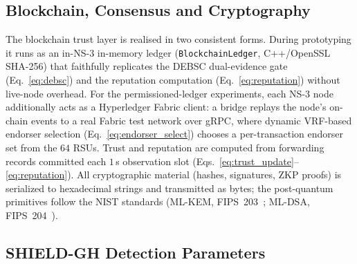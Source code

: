\documentclass[12pt, a4paper]{report}
\begin{document}
\subsection{Blockchain, Consensus and Cryptography}

The blockchain trust layer is realised in two consistent forms. During
prototyping it runs as an in-NS-3 in-memory ledger (\texttt{BlockchainLedger},
C++/OpenSSL SHA-256) that faithfully replicates the DEBSC dual-evidence gate
(Eq.~\eqref{eq:debsc}) and the reputation computation (Eq.~\eqref{eq:reputation})
without live-node overhead. For the permissioned-ledger experiments, each NS-3
node additionally acts as a Hyperledger Fabric client: a bridge replays the
node's on-chain events to a real Fabric test network over gRPC, where dynamic
VRF-based endorser selection (Eq.~\eqref{eq:endorser_select}) chooses a
per-transaction endorser set from the $64$ RSUs. Trust and reputation are
computed from forwarding records committed each $1$\,s observation slot
(Eqs.~\eqref{eq:trust_update}--\eqref{eq:reputation}). All cryptographic
material (hashes, signatures, ZKP proofs) is serialized to hexadecimal strings
and transmitted as bytes; the post-quantum primitives follow the NIST standards
(ML-KEM, FIPS~203~\cite{nist2024fips203}; ML-DSA, FIPS~204~\cite{nist2024fips204}).

\subsection{SHIELD-GH Detection Parameters}
\label{subsec:gh_detection_params}
\end{document}
